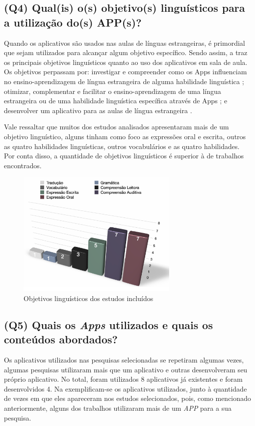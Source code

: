 \documentclass{textolivre}
\begin{document}
\subsection{(Q4) Qual(is) o(s) objetivo(s) linguísticos para a utilização do(s) APP(s)?}
Quando os aplicativos são usados nas aulas de línguas estrangeiras, é primordial que sejam utilizados para alcançar algum objetivo específico. Sendo assim, a  traz os principais objetivos linguísticos quanto ao uso dos aplicativos em sala de aula. Os objetivos perpassam por: investigar e compreender como os Apps influenciam no ensino-aprendizagem de língua estrangeira de alguma habilidade linguística \cite{almeida2018, censi2017, macias2016, magali2017, nascimento2017}; otimizar, complementar e facilitar o ensino-aprendizagem de uma língua estrangeira ou de uma habilidade linguística específica através de Apps \cite{lu2014, montes2018, redondo2017, ximena2017}; e desenvolver um aplicativo para as aulas de língua estrangeira \cite{liz2015, rodrigues2014}.

Vale ressaltar que muitos dos estudos analisados apresentaram mais de um objetivo linguístico, alguns tinham como foco as expressões oral e escrita, outros as quatro habilidades linguísticas, outros vocabulários e as quatro habilidades. Por conta disso, a quantidade de objetivos linguísticos é superior à de trabalhos encontrados. 

\begin{figure}[htbp]
 \centering
 \includegraphics[width=0.7\textwidth]{fig7.png}
 \caption{Objetivos linguísticos dos estudos incluídos}
 \label{fig7}
\end{figure}

\subsection{(Q5) Quais os \textit{Apps} utilizados e quais os conteúdos abordados?}
Os aplicativos utilizados nas pesquisas selecionadas se repetiram algumas vezes, algumas pesquisas utilizaram mais que um aplicativo e outras desenvolveram seu próprio aplicativo. No total, foram utilizados 8 aplicativos já existentes e foram desenvolvidos 4. Na  exemplificam-se os aplicativos utilizados, junto à quantidade de vezes em que eles apareceram nos estudos selecionados, pois, como mencionado anteriormente, alguns dos trabalhos utilizaram mais de um \textit{APP} para a sua pesquisa.
\end{document}
